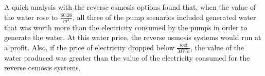
	A quick analysis with the reverse osmosis options found that, when the value of the water rose to $\frac{\$0.26}{m^3}$, all three of the pump scenarios included generated water that was worth more than the electricity consumed by the pumps in order to generate the water.  At this water price, the reverse osmosis systems would run at a profit.  Also, if the price of electricity dropped below $\frac{\$33}{MWh}$, the value of the water produced was greater than the value of the electricity consumed for the reverse osmosis systems. 
    
    

